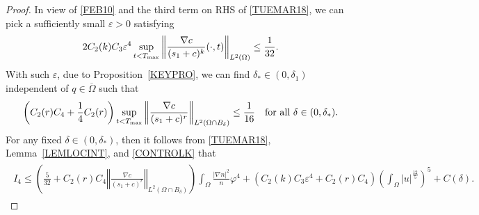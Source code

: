 \documentclass{amsart}
\numberwithin{equation}{section}
\newcommand{\bke}[1]{\left( #1 \right)}
\newcommand{\norm}[1]{\left\Vert #1 \right\Vert}
\begin{document}
\begin{proof}
In view of \eqref{FEB10} and the third term on RHS of \eqref{TUEMAR18}, we can pick a sufficiently small $\varepsilon >0$ satisfying 
\begin{equation}\label{CONTROLK}
 2 C_{2}(k)C_{3}\varepsilon^{4}\sup_{t<T_{\rm max}}\norm{\frac{\nabla c}{(s_{1}+c)^{k}}(\cdot,t)}_{L^{2}(\Omega)}\le\frac{1}{32}.
\end{equation}
With such $\varepsilon$, due to Proposition~\ref{KEYPRO}, we can find $\delta_{*}\in (0, \delta_1)$independent of $q\in\overline{\Omega}$ such that 
\begin{equation}\label{DELSTAR}
\left( C_{2}(r)C_{4}+ \frac{1}{4}C_{2}(r) \right)\sup_{t<T_{\rm max}} \norm{\frac{\nabla c}{(s_{1}+c)^{r}}}_{L^{2}(\Omega\cap B_{\delta})} \le \frac{1}{16} 
\quad\mbox{for all } \delta \in (0, \delta_{*}).
\end{equation}
For any fixed $\delta \in (0, \delta_{*})$, then it follows from \eqref{TUEMAR18}, Lemma~\ref{LEMLOCINT}, and \eqref{CONTROLK} that  
\begin{align*}
\begin{aligned}
I_4 
 \le  \left(\frac{5}{32} +C_{2}(r)C_{4}\norm{\frac{\nabla c}{(s_{1}+c)^{r}}}_{L^{2}(\Omega\cap B_{\delta})} \right)
 \int_{\Omega} \frac{|\nabla n|^{2}}{n}\varphi^{4} 
 +\left(C_{2}(k)C_{3}\varepsilon^{4}+C_{2}(r)C_{4}\right)\bke{\int_{\Omega}|u|^{\frac{12}{5}} }^{5}+ C(\delta).
\end{aligned}
\end{align*}


\end{proof}
\end{document}
